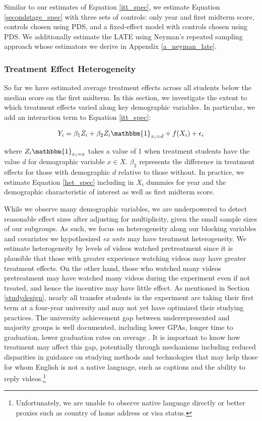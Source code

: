 \documentclass[12pt]{article}
\begin{document}
Similar to our estimates of Equation \ref{itt_spec}, we estimate Equation \ref{secondstage_spec} with three sets of controls: only year and first midterm score, controls chosen using PDS, and a fixed-effect model with controls chosen using PDS. We additionally estimate the LATE using Neyman's repeated sampling approach whose estimators we derive in Appendix \ref{a_neyman_late}.

\subsubsection{Treatment Effect Heterogeneity}

So far we have estimated average treatment effects across all students below the median score on the first midterm. In this section, we investigate the extent to which treatment effects varied along key demographic variables. In particular, we add an interaction term to Equation \ref{itt_spec}:

\begin{equation} \label{het_spec}
	Y_i = \beta_1 Z_i + \beta_2 Z_i \mathbbm{1}_{x_i=d} + f(X_i) + \epsilon_i
\end{equation}

where $Z_i \mathbbm{1}_{x_i=x}$ takes a value of 1 when treatment students have the value $d$ for demographic variable $x \in X$. $\beta_2$ represents the difference in treatment effects for those with demographic $d$ relative to those without. In practice, we estimate Equation \ref{het_spec} including in $X_i$ dummies for year and the demographic characteristic of interest as well as first midterm score.

While we observe many demographic variables, we are underpowered to detect reasonable effect sizes after adjusting for multiplicity, given the small sample sizes of our subgroups. As such, we focus on heterogeneity along our blocking variables and covariates we hypothesized \textit{ex ante} may have treatment heterogeneity. We estimate heterogeneity by levels of videos watched pretreatment since it is plausible that those with greater experience watching videos may have greater treatment effects. On the other hand, those who watched many videos pretreatment may have watched many videos during the experiment even if not treated, and hence the incentive may have little effect. As mentioned in Section \ref{studydesign}, nearly all transfer students in the experiment are taking their first term at a four-year university and may not yet have optimized their studying practices. The university achievement gap between underrepresented and majority groups is well documented, including lower GPAs, longer time to graduation, lower graduation rates on average \parencite{bcm2009}. It is important to know how treatment may affect this gap, potentially through mechanisms including reduced disparities in guidance on studying methods and technologies that may help those for whom English is not a native language, such as captions and the ability to reply videos.\footnote{Unfortunately, we are unable to observe native language directly or better proxies such as country of home address or visa status.}
\end{document}
